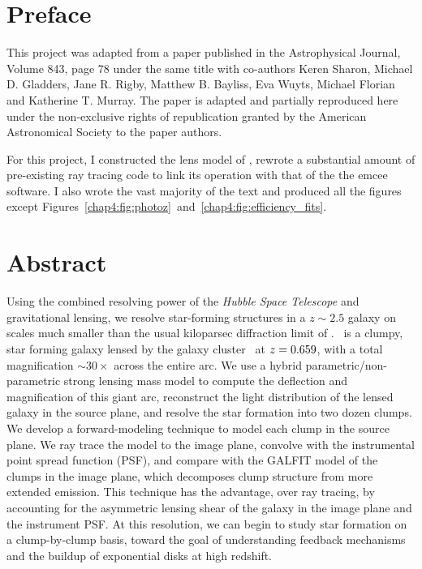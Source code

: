 \section{Preface}

This project was adapted from a paper published in the Astrophysical Journal, Volume 843, page 78 under the same title with co-authors Keren Sharon, Michael D. Gladders, Jane R. Rigby, Matthew B. Bayliss, Eva Wuyts, Michael Florian and Katherine T. Murray. The paper is adapted and partially reproduced here under the non-exclusive rights of republication granted by the American Astronomical Society to the paper authors.

For this project, I constructed the lens model of \cluster, rewrote a substantial amount of pre-existing ray tracing code to link its operation with that of the the emcee software. I also wrote the vast majority of the text and produced all the figures except Figures~\ref{chap4:fig:photoz}~and~\ref{chap4:fig:efficiency_fits}. 

\section{Abstract}
Using the combined resolving power of the {\it Hubble Space Telescope} and gravitational lensing, we resolve star-forming structures in a $z\sim2.5$ galaxy on scales much smaller than the usual kiloparsec diffraction limit of \hst. \giantarc\ is a clumpy, star forming galaxy lensed by the galaxy cluster \cluster\ at $z=0.659$, with a total magnification $\sim30\times$ across the entire arc. We use a hybrid parametric/non-parametric strong lensing mass model to compute the deflection and magnification of this giant arc, reconstruct the light distribution of the lensed galaxy in the source plane, and resolve the star formation into two dozen clumps. We develop a forward-modeling technique to model each clump in the source plane. We ray trace the model to the image plane, convolve with the instrumental point spread function (PSF), and compare with the GALFIT model of the clumps in the image plane, which decomposes clump structure from more extended emission. This technique has the advantage, over ray tracing, by accounting for the asymmetric lensing shear of the galaxy in the image plane and the instrument PSF. At this resolution, we can begin to study star formation on a clump-by-clump basis, toward the goal of understanding feedback mechanisms and the buildup of exponential disks at high redshift.

